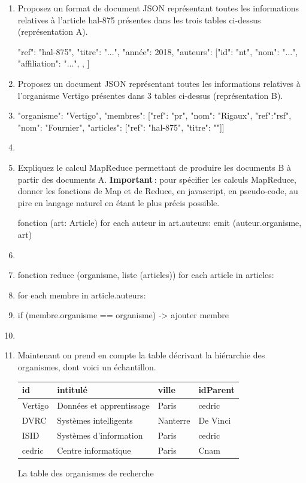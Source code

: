 \documentclass[11pt,a4paper]{article}
\newcommand{\cle}[1]{\textbf{#1}}
\begin{document}
\begin{enumerate}
  \item Proposez un format de document JSON représentant toutes les informations
        relatives à l'article hal-875 présentes dans les trois tables ci-dessus (représentation A).

{"ref": "hal-875", "titre": "...", "année": 2018, "auteurs": [{"id": "nt", "nom": "...", "affiliation": "..."}, {}, {}]}

  \item Proposez un document JSON représentant toutes les
        informations relatives à l'organisme Vertigo présentes dans 3 tables ci-dessus
         (représentation B).

\item {"organisme": "Vertigo", "membres": [{"ref": "pr", "nom": "Rigaux"}, {"ref":"rsf", "nom": "Fournier", "articles": [{"ref": "hal-875", "titre": ""}]}]}
\item 
   \item Expliquez le calcul MapReduce permettant de produire les documents
   B à partir des documents A.
   \textbf{Important}\,: pour spécifier les calculs MapReduce, donner les fonctions de Map et de Reduce, en javascript,
en pseudo-code, au pire en langage naturel en étant le plus précis possible.

fonction (art: Article)
for each auteur in art.auteurs: emit (auteur.organisme, art)
\item 
\item fonction reduce (organisme, liste (articles))
for each article in articles:
\item for each membre in article.auteurs:
\item if (membre.organisme == organisme) -> ajouter membre
\item 

   \item Maintenant on prend en compte la table décrivant la hiérarchie des organismes,
         dont voici un échantillon.
         \begin{center}
         \begin{tabular}{l|l|l|l}
\cle{id} & intitulé & ville & idParent\\
\hline
Vertigo & Données et apprentissage & Paris & cedric \\
DVRC & Systèmes intelligents & Nanterre & De Vinci \\
ISID & Systèmes d'information & Paris &  cedric\\
cedric & Centre informatique  & Paris &  Cnam\\
\hline
\end{tabular}
\centerline{La table des organismes de recherche}
\end{center}


\end{enumerate}
\end{document}

